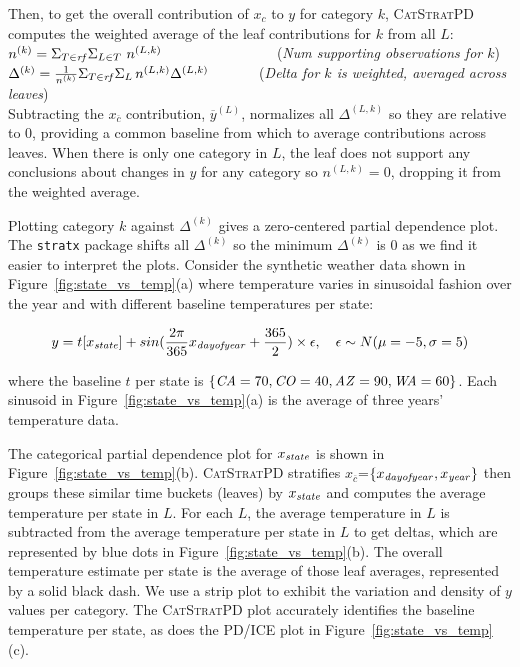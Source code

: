 \documentclass[12pt]{article}
\newcommand{\figref}[1]{Figure~\ref{#1}}
\newcommand{\cspd}{\fontfamily{cmr}\textsc{\small CatStratPD}}
\newcommand{\xnc}{$x_{\overline{c}}$}
\begin{document}
\noindent Then, to get the overall contribution of $x_c$ to $y$ for category $k$, \cspd{} computes the weighted average of the leaf contributions for $k$ from all $L$:\\

\noindent $n^{(k)} = \Sigma_{T \in {\it rf}} \Sigma_{L \in T} ~n^{(L,k)}$~\,~~~~~~~~~~~~~~~({\it Num supporting observations for $k$})\\
$\Delta^{(k)} = \frac{1}{n^{(k)}} \Sigma_{T \in {\it rf}} \Sigma_{L} \,n^{(L,k)}\Delta^{(L,k)}$~~~~~~~({\it Delta for $k$ is weighted, averaged across leaves})\\

\noindent Subtracting the \xnc{} contribution, $\overline{y}^{(L)}$, normalizes all $\Delta^{(L,k)}$ so they are relative to 0, providing a common baseline from which to average contributions across leaves. When there is only one category in $L$, the leaf does not support any conclusions about changes in $y$ for any category so $n^{(L,k)}=0$, dropping it from the weighted average. 

Plotting category $k$ against $\Delta^{(k)}$ gives a zero-centered partial dependence plot. The {\tt stratx} package shifts all $\Delta^{(k)}$ so the minimum $\Delta^{(k)}$ is 0 as we find it easier to interpret the plots. Consider the synthetic weather data shown in \figref{fig:state_vs_temp}(a) where temperature varies in sinusoidal fashion over the year and with different baseline temperatures per state:

\begin{equation}\label{eq:weather}
y = t[x_{\it state}] + sin(\frac{2 \pi}{365} x_{\it dayofyear} + \frac{365}{2}) \times \epsilon, ~~~ \epsilon \sim N(\mu=-5,\sigma=5)
\end{equation}

\noindent where the baseline $t$ per state is $\{{\it CA}=70, {\it CO}=40, {\it AZ}=90, {\it WA}=60\}$. Each sinusoid in \figref{fig:state_vs_temp}(a) is the average of three years' temperature data.

The categorical partial dependence plot for $x_{\it state}$ is shown in \figref{fig:state_vs_temp}(b).
\cspd{} stratifies \xnc{}=$\{x_{\it dayofyear}, x_{\it year}\}$ then groups these similar time buckets (leaves) by $x_{\it state}$ and computes the average temperature per state in $L$. For each $L$, the average temperature in $L$ is subtracted from the average temperature per state in $L$ to get deltas, which are represented by blue dots in \figref{fig:state_vs_temp}(b). The overall temperature estimate per state is the average of those leaf averages, represented by a solid black dash. We use a strip plot to exhibit the variation and density of $y$ values per category. The \cspd{} plot accurately identifies the baseline temperature per state, as does the PD/ICE plot in \figref{fig:state_vs_temp}(c).
\end{document}

